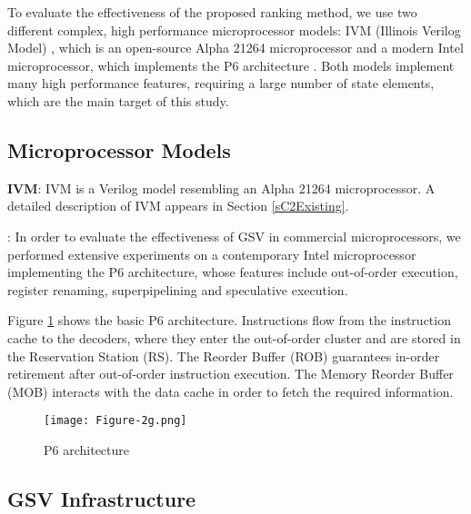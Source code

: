 \documentclass[12pt]{yalephd}
\begin{document}
To evaluate the effectiveness of the proposed ranking method, we use two different complex, high performance microprocessor models: IVM (Illinois Verilog Model) \cite{WQRP04}, which is an open-source Alpha 21264 microprocessor and a modern Intel microprocessor, which implements the P6 architecture \cite{GW95}. Both models implement many high performance features, requiring a large number of state elements, which are the main target of this study.

\subsection{Microprocessor Models}

{\bf IVM}: IVM is a Verilog model resembling an Alpha 21264 microprocessor. A detailed description of IVM appears in Section \ref{sC2Existing}.

: In order to evaluate the effectiveness of GSV in commercial microprocessors, we performed extensive experiments on a contemporary Intel microprocessor implementing the P6 architecture, whose features include out-of-order execution, register renaming, superpipelining and speculative execution.

Figure \ref{fP6} shows the basic P6 architecture. Instructions flow from the instruction cache to the decoders, where they enter the out-of-order cluster and are stored in the Reservation Station (RS). The Reorder Buffer (ROB) guarantees in-order retirement after out-of-order instruction execution. The Memory Reorder Buffer (MOB) interacts with the data cache in order to fetch the required information.

\begin{figure}[!ht]
\centering
\texttt{[image: Figure-2g.png]}
\caption{P6 architecture \cite{GW95}}
\label{fP6}
\end{figure}


\subsection{GSV Infrastructure}
\end{document}
